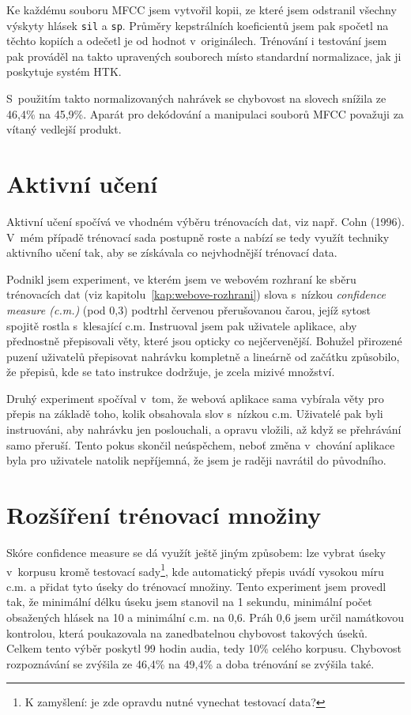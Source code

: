 Ke každému souboru MFCC jsem vytvořil kopii, ze které
jsem odstranil všechny výskyty hlásek \texttt{sil} a \texttt{sp}. Průměry kepstrálních
koeficientů jsem pak spočetl na těchto kopiích a odečetl je od hodnot
v~originálech. Trénování i testování jsem pak prováděl na takto upravených
souborech místo standardní normalizace, jak ji poskytuje systém HTK.

S~použitím takto normalizovaných nahrávek se chybovost na slovech snížila ze
46,4\% na 45,9\%.  Aparát pro dekódování
a manipulaci souborů MFCC považuji za vítaný vedlejší produkt.

\section{Aktivní učení}

Aktivní učení spočívá ve vhodném výběru trénovacích dat, viz např. Cohn
(1996)\cite{cohn1996active}. V~mém případě trénovací sada postupně roste a nabízí
se tedy využít techniky aktivního učení tak, aby se získávala co nejvhodnější
trénovací data.

Podnikl jsem experiment, ve kterém jsem ve webovém rozhraní ke sběru trénovacích
dat (viz kapitolu~\ref{kap:webove-rozhrani}) slova s~nízkou {\em confidence
measure (c.m.)} (pod 0,3) podtrhl červenou přerušovanou čarou, jejíž sytost spojitě rostla
s~klesající c.m. Instruoval jsem pak uživatele aplikace, aby přednostně
přepisovali věty, které jsou opticky co nejčervenější. Bohužel přirozené puzení
uživatelů přepisovat nahrávku kompletně a lineárně od začátku způsobilo, že
přepisů, kde se tato instrukce dodržuje, je zcela mizivé množství.

Druhý experiment spočíval v~tom, že webová aplikace sama vybírala věty pro
přepis na základě toho, kolik obsahovala slov s~nízkou c.m. Uživatelé pak byli
instruováni, aby nahrávku jen poslouchali, a opravu vložili, až když se
přehrávání samo přeruší. Tento pokus skončil neúspěchem, neboť
změna v~chování aplikace byla pro uživatele natolik nepříjemná, že jsem je
raději navrátil do původního.

\section{Rozšíření trénovací množiny}
\label{sec:confident}

Skóre confidence measure se dá využít ještě jiným způsobem: lze vybrat
úseky v~korpusu kromě testovací sady\footnote{K zamyšlení: je zde opravdu nutné
vynechat testovací data?}, kde automatický přepis uvádí vysokou míru
c.m. a přidat tyto úseky do trénovací množiny. Tento experiment jsem provedl
tak, že minimální délku úseku jsem stanovil na 1 sekundu, minimální počet
obsažených hlásek na 10 a minimální c.m. na 0,6. Práh 0,6 jsem určil namátkovou
kontrolou, která poukazovala na zanedbatelnou chybovost takových úseků. Celkem
tento výběr poskytl 99 hodin audia, tedy 10\% celého korpusu.
Chybovost rozpoznávání se zvýšila ze 46,4\% na 49,4\% a doba trénování
se zvýšila také.

